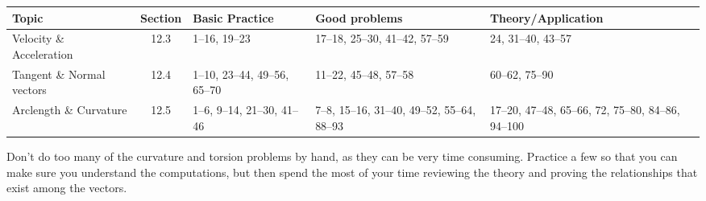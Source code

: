 \newpage



\begin{center}
  \begin{tabular}{p{1in}cp{1.3in}p{1.3in}p{1.3in}}\toprule
    Topic & Section & Basic Practice & Good problems & Theory/Application \\\midrule
    Velocity \& Acceleration & 12.3 & 1--16, 19--23 & 17--18, 25--30, 41--42, 57--59 & 24, 31--40, 43--57 \\
    Tangent \& Normal vectors & 12.4 & 1--10, 23--44, 49--56, 65--70 & 11--22, 45--48, 57--58 & 60--62, 75--90 \\
    Arclength \& Curvature & 12.5 & 1--6, 9--14, 21--30, 41--46 & 7--8, 15--16, 31--40, 49--52, 55--64, 88--93 & 17--20, 47--48, 65--66, 72, 75--80, 84--86, 94--100
    \\\bottomrule
  \end{tabular}
\end{center}

Don't do too many of the curvature and torsion problems by hand, as
they can be very time consuming.  Practice a few so that you can make
sure you understand the computations, but then spend the most of your
time reviewing the theory and proving the relationships that exist
among the vectors.


